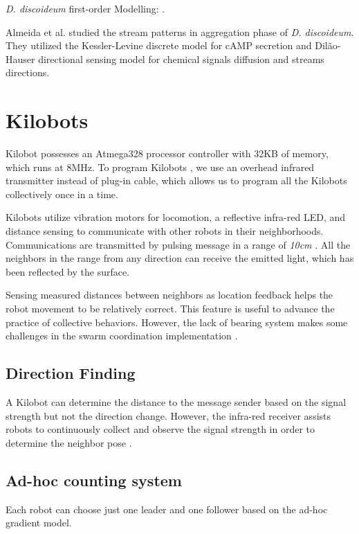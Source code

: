 \documentclass[11pt,a4paper]{article}
\begin{document}
\textit{D. discoideum} first-order Modelling: \cite{palsson2000model, dallon2006mathematically, maree2000pattern}.

 Almeida et al. \cite{almeida2016directional} studied the stream patterns in aggregation phase of \textit{D. discoideum}. They utilized the Kessler-Levine discrete model \cite{kessler1993pattern} for cAMP secretion and Dilão-Hauser directional sensing model \cite{dilao2013chemotaxis} for chemical signals  diffusion and streams directions.
\section {Kilobots} 
Kilobot possesses an Atmega328 processor controller with 32KB of memory, which runs at 8MHz. To program Kilobots \cite{Nagpal2012}, we use an overhead infrared transmitter instead of plug-in cable, which allows us to program all the Kilobots collectively once in a time.

Kilobots utilize vibration motors for locomotion, a reflective infra-red LED, and distance sensing to communicate with other robots in their neighborhoods. Communications are transmitted by pulsing message in a range of \textit{10cm}  \cite{Nagpal2012}. All the neighbors in the range from any direction can receive the emitted light, which has been reflected by the surface. 

Sensing measured distances between neighbors as location feedback helps the robot movement to be relatively correct. This feature is useful to advance the practice of collective behaviors. However, the lack of bearing system makes some challenges in the swarm coordination implementation \cite{griffith2016evolutionary}. 




\subsection{Direction Finding}
A Kilobot can determine the distance to the message sender based on the signal strength but not the direction change. However, the infra-red receiver assists robots to continuously collect and observe the signal strength in order to determine the neighbor pose \cite{griffith2016evolutionary}.
\subsection{Ad-hoc counting system}
Each robot can choose just one leader and one follower based on the ad-hoc gradient model. 
\end{document}
